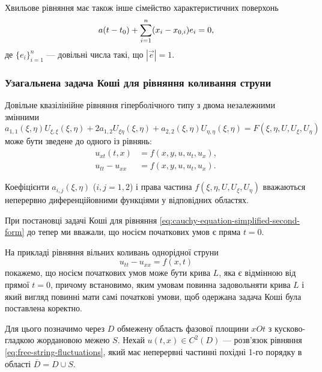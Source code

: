 Хвильове рівняння має також інше сімейство характеристичних поверхонь
\begin{equation}
    a (t - t_0) + \displaystyle\sum\limits_{i = 1}^n (x_i - x_{0,i}) e_i = 0,
\end{equation}
де $\{e_i\}_{i = 1}^n$ --- довільні числа такі, що $|\vec e| = 1$.

\subsubsection{Узагальнена задача Коші для рівняння коливання струни}

Довільне квазілінійне рівняння гіперболічного типу з двома незалежними змінними
\begin{equation}
    a_{1, 1} (\xi, \eta) U_{\xi, \xi} (\xi, \eta) + 2 a_{1, 2} U_{\xi \eta}(\xi, \eta) + a_{2, 2} (\xi, \eta) U_{\eta, \eta}(\xi, \eta) = F(\xi, \eta, U, U_\xi, U_\eta)
\end{equation}
може бути зведене до одного із рівнянь:
\begin{align}
    u_{xt}(t,x) &= f(x, y, u, u_t, u_x), \\
    \label{eq:cauchy-equation-simplified-second-form}
    u_{tt} - u_{xx} &= f(x, y, u, u_t, u_x).
\end{align}

\begin{remark}
    Коефіцієнти $a_{i,j}(\xi,\eta)$ ($i, j = 1, 2$) і права частина $f(\xi, \eta, U, U_\xi, U_\eta)$ вважаються неперервно диференційовними функціями у відповідних областях.
\end{remark}

При постановці задачі Коші для рівняння \eqref{eq:cauchy-equation-simplified-second-form} до тепер ми вважали, що носієм початкових умов є пряма $t = 0$. \medskip

На прикладі рівняння вільних коливань однорідної струни
\begin{equation}
    \label{eq:free-string-fluctuations}
    u_{tt} - u_{xx} = f(x, t)
\end{equation}
покажемо, що носієм початкових умов може бути крива $L$, яка є відмінною від прямої $t = 0$, причому встановимо, яким умовам повинна задовольняти крива $L$ і який вигляд повинні мати самі початкові умови, щоб одержана задача Коші була поставлена коректно. \medskip

Для цього позначимо через $D$ обмежену область фазової площини $xOt$ з кусково-гладкою жордановою межею $S$. Нехай $u(t, x) \in C^2(D)$ --- розв'язок рівняння \eqref{eq:free-string-fluctuations}, який має неперервні частинні похідні 1-го порядку в області $\overline{D} = D \cup S$. \medskip

